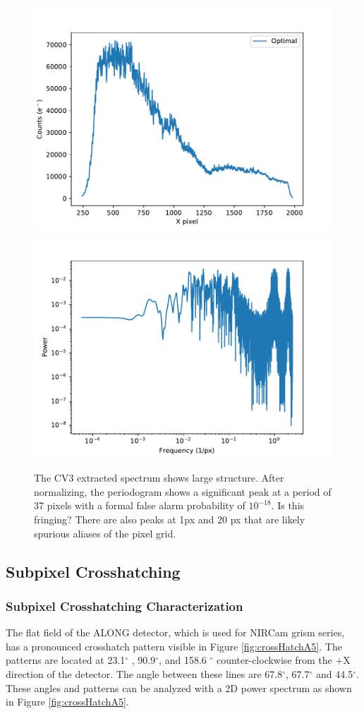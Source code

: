 \documentclass{aastex62}
\newcommand{\degree}{^\circ}
\begin{document}
\begin{figure}[!hbtp]
\centering
\includegraphics[width=.49\columnwidth]{labLED_ind_spec_CV3NRCN036810.pdf}
\includegraphics[width=.49\columnwidth]{labLED_spec_periodo_CV3NRCN036810.pdf}
\caption{The CV3 extracted spectrum shows large structure.
After normalizing, the periodogram shows a significant peak at a period of 37 pixels with a formal false alarm probability of $10^{-18}$.
Is this fringing?
There are also peaks at 1px and 20 px that are likely spurious aliases of the pixel grid.}\label{fig:cv3ExtractedSpectrum}
\end{figure}


\subsection{Subpixel Crosshatching}

\subsubsection{Subpixel Crosshatching Characterization}
The flat field of the ALONG detector, which is used for NIRCam grism series, has a pronounced crosshatch pattern visible in Figure \ref{fig:crossHatchA5}.
The patterns are located at 23.1$\degree$ , 90.9$\degree$, and 158.6 $\degree$ counter-clockwise from the $+$X direction of the detector.
The angle between these lines are 67.8$\degree$, 67.7$\degree$ and 44.5$\degree$.
These angles and patterns can be analyzed with a 2D power spectrum as shown in Figure \ref{fig:crossHatchA5}.
\end{document}
